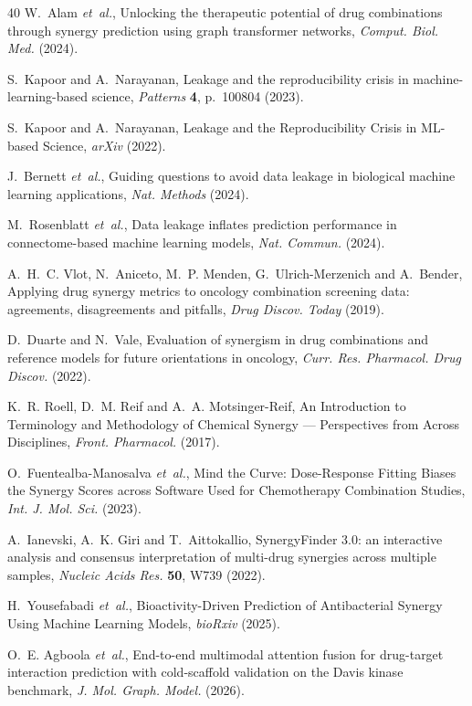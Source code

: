 \documentclass{ws-procs11x85}
\begin{document}
\begin{thebibliography}{40}
W.~Alam {\it et~al.}, Unlocking the therapeutic potential of drug combinations
  through synergy prediction using graph transformer networks, {\it Comput.
  Biol. Med.}  (2024).

S.~Kapoor and A.~Narayanan, Leakage and the reproducibility crisis in
  machine-learning-based science, {\it Patterns} {\bf 4}, p.~100804 (2023).

S.~Kapoor and A.~Narayanan, Leakage and the Reproducibility Crisis in ML-based
  Science, {\it arXiv}  (2022).

J.~Bernett {\it et~al.}, Guiding questions to avoid data leakage in biological
  machine learning applications, {\it Nat. Methods}  (2024).

M.~Rosenblatt {\it et~al.}, Data leakage inflates prediction performance in
  connectome-based machine learning models, {\it Nat. Commun.}  (2024).

A.~H.~C. Vlot, N.~Aniceto, M.~P. Menden, G.~Ulrich-Merzenich and A.~Bender,
  Applying drug synergy metrics to oncology combination screening data:
  agreements, disagreements and pitfalls, {\it Drug Discov. Today}  (2019).

D.~Duarte and N.~Vale, Evaluation of synergism in drug combinations and
  reference models for future orientations in oncology, {\it Curr. Res.
  Pharmacol. Drug Discov.}  (2022).

K.~R. Roell, D.~M. Reif and A.~A. Motsinger-Reif, An Introduction to
  Terminology and Methodology of Chemical Synergy --- Perspectives from Across
  Disciplines, {\it Front. Pharmacol.}  (2017).

O.~Fuentealba-Manosalva {\it et~al.}, Mind the Curve: Dose-Response Fitting
  Biases the Synergy Scores across Software Used for Chemotherapy Combination
  Studies, {\it Int. J. Mol. Sci.}  (2023).

A.~Ianevski, A.~K. Giri and T.~Aittokallio, SynergyFinder 3.0: an interactive
  analysis and consensus interpretation of multi-drug synergies across multiple
  samples, {\it Nucleic Acids Res.} {\bf 50}, W739 (2022).

H.~Yousefabadi {\it et~al.}, Bioactivity-Driven Prediction of Antibacterial
  Synergy Using Machine Learning Models, {\it bioRxiv}  (2025).

O.~E. Agboola {\it et~al.}, End-to-end multimodal attention fusion for
  drug-target interaction prediction with cold-scaffold validation on the Davis
  kinase benchmark, {\it J. Mol. Graph. Model.}  (2026).


\end{thebibliography}
\end{document}
